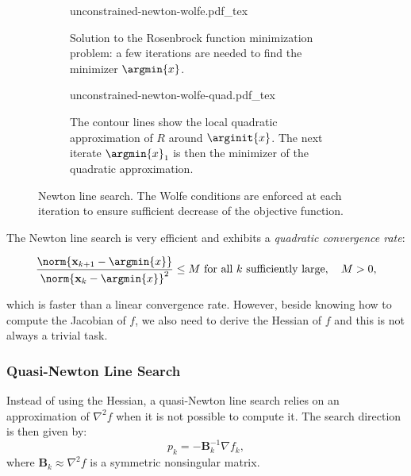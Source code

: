 \begin{figure}
  \setlength{\belowcaptionskip}{\baselineskip}
  \centering
  \begin{subfigure}{0.8\columnwidth}
    \centering
        {\def\svgwidth{\linewidth}
          {\footnotesize
            
                       {unconstrained-newton-wolfe.pdf_tex}
          }
        }
        \caption{Solution to the Rosenbrock function minimization
          problem: a few iterations are needed to find the minimizer
          $\argmin{x}$.}
        \label{fig:chap3-unconstrained-newton-wolfe-a}
  \end{subfigure}
  \begin{subfigure}{0.8\columnwidth}
    \centering
        {\def\svgwidth{\linewidth}
          {\footnotesize
            
                       {unconstrained-newton-wolfe-quad.pdf_tex}
          }
        }
        \caption{The contour lines show the local quadratic
          approximation of $R$ around $\arginit{x}$. The next iterate
          $\argmin{x}_1$ is then the minimizer of the quadratic
          approximation.}
        \label{fig:chap3-unconstrained-newton-wolfe-quad}
  \end{subfigure}
  \caption{Newton line search. The Wolfe conditions are enforced at
    each iteration to ensure sufficient decrease of the objective
    function.}
  \label{fig:chap3-unconstrained-newton-wolfe}
\end{figure}

The Newton line search is very efficient and exhibits a
\emph{quadratic convergence rate}:

\begin{equation}
\frac{\norm{\mathbf{x}_{k+1}-\argmin{x}}}{\norm{\mathbf{x}_k-\argmin{x}}^2}
\le M \text{ for all } k \text{ sufficiently large}, \quad M>0,
\end{equation}

which is faster than a linear convergence rate. However, beside
knowing how to compute the Jacobian of $f$, we also need to derive the
Hessian of $f$ and this is not always a trivial task.

\subsubsection{Quasi-Newton Line Search}
\label{subsubsec:chap3-quasi-newton-line-search}

Instead of using the Hessian, a quasi-Newton line search relies on an
approximation of $\nabla^2 f$ when it is not possible to compute
it. The search direction is then given by:
\begin{equation}
p_k=-\mathbf{B}_k^{-1}\nabla f_k,
\end{equation}
where $\mathbf{B}_k\approx\nabla^2 f$ is a symmetric nonsingular
matrix.

